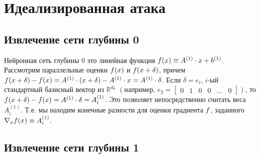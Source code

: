 
\section{Идеализированная атака}
\subsection{Извлечение сети глубины 0}
  Нейронная сеть глубины $0$ это линейная функция $ \mathnormal{f}( \mathnormal{x}) \equiv A^{\left (1\right)} \cdot  \mathnormal{x} + b^{\left(1\right)}$.
  Рассмотрим параллельные оценки $ \mathnormal{f}( \mathnormal{x})$ и $ \mathnormal{f}( \mathnormal{x}+\delta)$, причем $ \mathnormal{f}( \mathnormal{x}+\delta)- \mathnormal{f}( \mathnormal{x})=A^{\left (1\right)} \cdot \left( \mathnormal{x}+\delta\right)-A^{\left (1\right)} \cdot  \mathnormal{x} = A^{\left (1\right)} \cdot \delta$.
  Если $\delta = e_{i}$, $i$-ый стандартный базисный вектор из $\mathbb {R}^{d_{0}}$ $\left( \text{например, } e_{2}=\begin{bmatrix}0 & 1 & 0 & 0 & \dots & 0\end{bmatrix}\right)$, то $ \mathnormal{f}( \mathnormal{x}+\delta)- \mathnormal{f}( \mathnormal{x})= A^{\left (1\right)} \cdot \delta =  A_{i}^{\left (1\right)}$.
  Это позволяет непосредственно считать веса $A_{i}^{\left (1\right)}$. Т.е. мы находим конечные разности для оценки градиента $ \mathnormal{f}$, заданного ${\nabla}_{ \mathnormal{x}} \mathnormal{f}( \mathnormal{x}) \equiv A_{i}^{\left (1\right)}$.
 \begin{figure}[h]
\end{figure}


\subsection{Извлечение сети глубины 1}

